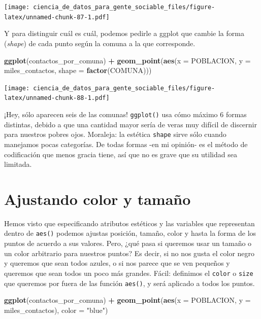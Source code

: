 \documentclass[]{book}
\newenvironment{Shaded}{\begin{snugshade}}{\end{snugshade}}
\newcommand{\KeywordTok}[1]{\textcolor[rgb]{0.13,0.29,0.53}{\textbf{#1}}}
\newcommand{\DataTypeTok}[1]{\textcolor[rgb]{0.13,0.29,0.53}{#1}}
\newcommand{\StringTok}[1]{\textcolor[rgb]{0.31,0.60,0.02}{#1}}
\newcommand{\OperatorTok}[1]{\textcolor[rgb]{0.81,0.36,0.00}{\textbf{#1}}}
\newcommand{\NormalTok}[1]{#1}
\begin{document}
\texttt{[image: ciencia\_de\_datos\_para\_gente\_sociable\_files/figure-latex/unnamed-chunk-87-1.pdf]}

Y para distinguir cuál es cuál, podemos pedirle a ggplot que cambie la
forma (\emph{shape}) de cada punto según la comuna a la que corresponde.

\begin{Shaded}
\begin{Highlighting}[]
\KeywordTok{ggplot}\NormalTok{(contactos_por_comuna) }\OperatorTok{+}\StringTok{ }
\StringTok{    }\KeywordTok{geom_point}\NormalTok{(}\KeywordTok{aes}\NormalTok{(}\DataTypeTok{x =}\NormalTok{ POBLACION, }\DataTypeTok{y =}\NormalTok{ miles_contactos, }\DataTypeTok{shape =} \KeywordTok{factor}\NormalTok{(COMUNA)))}
\end{Highlighting}
\end{Shaded}

\texttt{[image: ciencia\_de\_datos\_para\_gente\_sociable\_files/figure-latex/unnamed-chunk-88-1.pdf]}

¡Hey, sólo aparecen seis de las comunas! \texttt{ggplot()} usa cómo
máximo 6 formas distintas, debido a que una cantidad mayor sería de
veras muy difícil de discernir para nuestros pobres ojos. Moraleja: la
estética \texttt{shape} sirve sólo cuando manejamos pocas categorías. De
todas formas -en mi opinión- es el método de codificación que menos
gracia tiene, así que no es grave que su utilidad sea limitada.

\section{Ajustando color y tamaño}\label{ajustando-color-y-tamano}

Hemos visto que especificando atributos estéticos y las variables que
representan dentro de \texttt{aes()} podemos ajustas posición, tamaño,
color y hasta la forma de los puntos de acuerdo a sus valores. Pero,
¿qué pasa si queremos usar un tamaño o un color arbitrario para nuestros
puntos? Es decir, si no nos gusta el color negro y queremos que sean
todos azules, o si nos parece que se ven pequeños y queremos que sean
todos un poco más grandes. Fácil: definimos el \texttt{color} o
\texttt{size} que queremos por fuera de las función \texttt{aes()}, y
será aplicado a todos los puntos.

\begin{Shaded}
\begin{Highlighting}[]
\KeywordTok{ggplot}\NormalTok{(contactos_por_comuna) }\OperatorTok{+}\StringTok{ }
\StringTok{    }\KeywordTok{geom_point}\NormalTok{(}\KeywordTok{aes}\NormalTok{(}\DataTypeTok{x =}\NormalTok{ POBLACION, }\DataTypeTok{y =}\NormalTok{ miles_contactos), }\DataTypeTok{color =} \StringTok{"blue"}\NormalTok{)}
\end{Highlighting}
\end{Shaded}
\end{document}
